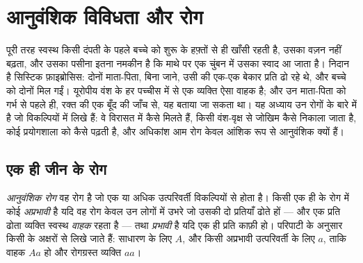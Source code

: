 \chapter{आनुवंशिक विविधता और रोग}\label{ch:g11:genes-and-disease}

पूरी तरह स्वस्थ किसी दंपती के पहले बच्चे को शुरू के हफ़्तों से ही खाँसी
रहती है, उसका वज़न नहीं बढ़ता, और उसका पसीना इतना नमकीन है कि माथे पर एक
चुंबन में उसका स्वाद आ जाता है। निदान है सिस्टिक फ़ाइब्रोसिस: दोनों
माता-पिता, बिना जाने, उसी  की एक-एक बेकार प्रति ढो रहे थे, और बच्चे को
दोनों मिल गईं। यूरोपीय वंश के हर पच्चीस में से एक व्यक्ति ऐसा वाहक है; और
उन माता-पिता को गर्भ से पहले ही, रक्त की एक बूँद की जाँच से, यह बताया जा
सकता था। यह अध्याय उन रोगों के बारे में है जो विकल्पियों में लिखे हैं: वे
विरासत में कैसे मिलते हैं, किसी वंश-वृक्ष से जोखिम कैसे निकाला जाता है,
कोई प्रयोगशाला  को कैसे पढ़ती है, और अधिकांश आम रोग केवल आंशिक रूप से
आनुवंशिक क्यों हैं।

\section{एक ही जीन के रोग}

\begin{definition}[आनुवंशिक रोग, प्रभावी और अप्रभावी]\label{def:g11:genes-and-disease:genetic}
\emph{आनुवंशिक रोग} वह रोग है जो एक या अधिक
उत्परिवर्ती विकल्पियों से होता है। किसी एक ही  के रोग में कोई 
\emph{अप्रभावी} है यदि वह रोग केवल उन लोगों में उभरे जो
उसकी दो प्रतियाँ ढोते हों --- और एक प्रति ढोता व्यक्ति स्वस्थ
\emph{वाहक} रहता है --- तथा \emph{प्रभावी} है
यदि एक ही प्रति काफ़ी हो। परिपाटी के अनुसार किसी  के  अक्षरों से
लिखे जाते हैं: साधारण  के लिए $A$, और किसी अप्रभावी उत्परिवर्ती के
लिए $a$, ताकि वाहक $Aa$ हो और रोगग्रस्त व्यक्ति $aa$।
\end{definition}

